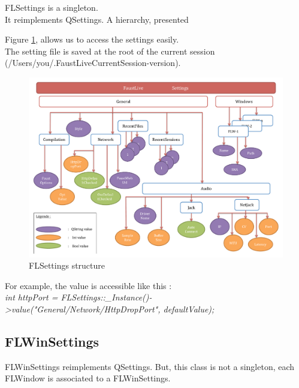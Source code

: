 \documentclass[a4paper]{article}
\begin{document}
FLSettings is a singleton. \\ 
It reimplements QSettings. A hierarchy, presented {Figure \ref{fig:FLSettings}, allows us to access the settings easily. \\

The setting file is saved at the root of the current session (/Users/you/.FaustLiveCurrentSession-version).
 
\begin{figure}[!h]
\begin{center}
\includegraphics[width=\columnwidth]{images/FLSettings}
\caption{FLSettings structure}
\label{fig:FLSettings}
\end{center}
\end{figure}
 
For example, the value is accessible like this :\\
\textit{int httpPort = FLSettings::\_Instance()->value("General/Network/HttpDropPort", defaultValue);}

\subsection{FLWinSettings \label{FLWinSettings}}

FLWinSettings reimplements QSettings. But, this class is not a singleton, each FLWindow is associated to a FLWinSettings. 

}
\end{document}
